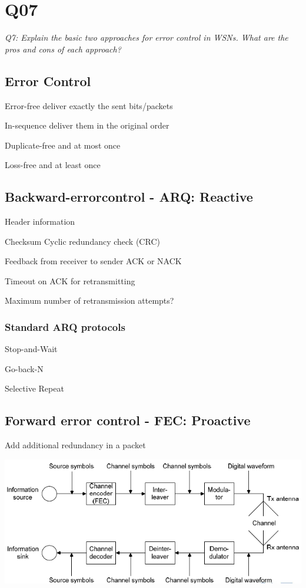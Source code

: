 \chapter{Q07}
\emph{Q7: Explain the basic two approaches for error control in WSNs. What are
the pros and cons of each approach?}

\section{Error Control}

\begin{description}
	\item{Error-free} deliver exactly the sent bits/packets
	\item{In-sequence} deliver them in the original order
	\item{Duplicate-free} and at most once
	\item{Loss-free} and at least once
\end{description}


\section{Backward-errorcontrol - ARQ: Reactive}

Header information

Checksum Cyclic redundancy check (CRC) 

Feedback from receiver to sender ACK or NACK

Timeout on ACK for retransmitting

Maximum number of retransmission attempts?

\subsection{Standard ARQ protocols}
\begin{description}
	\item Stop-and-Wait
	\item Go-back-N
	\item Selective Repeat
\end{description}

\section{Forward error control - FEC: Proactive}

Add additional redundancy in a packet

\begin{center}
 \includegraphics[scale=0.5]{img/ErrorControle-FEC.png}
\end{center}

